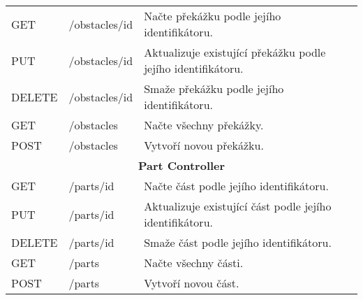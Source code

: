 \begin{longtable}{|l|l|p{}|}
    \hline
    GET             & /obstacles/{id}             & Načte překážku podle jejího identifikátoru.                                                                                                \\
    PUT             & /obstacles/{id}             & Aktualizuje existující překážku podle jejího identifikátoru.                                                                               \\
    DELETE          & /obstacles/{id}             & Smaže překážku podle jejího identifikátoru.                                                                                                \\
    GET             & /obstacles                  & Načte všechny překážky.                                                                                                                    \\
    POST            & /obstacles                  & Vytvoří novou překážku.                                                                                                                    \\
    \hline
    \multicolumn{3}{|c|}{\textbf{Part Controller}}                                                                                                                                             \\
    \hline
    GET             & /parts/{id}                 & Načte část podle jejího identifikátoru.                                                                                                    \\
    PUT             & /parts/{id}                 & Aktualizuje existující část podle jejího identifikátoru.                                                                                   \\
    DELETE          & /parts/{id}                 & Smaže část podle jejího identifikátoru.                                                                                                    \\
    GET             & /parts                      & Načte všechny části.                                                                                                                       \\
    POST            & /parts                      & Vytvoří novou část.                                                                                                                        \\

\end{longtable}
